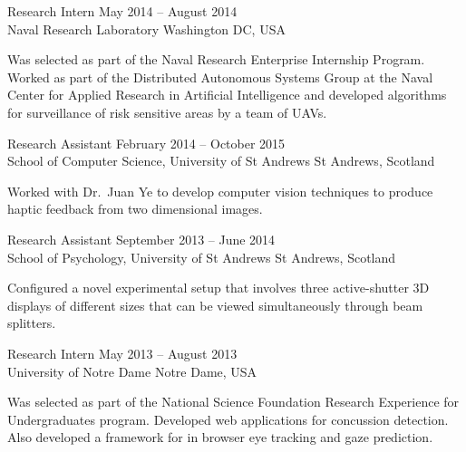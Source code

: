 \documentclass[line,margin]{cv}
\begin{document}
\begin{resume}
\begin{adjustwidth}{2.5em}{2.5em}
\end{adjustwidth}

\newpage

Research Intern
\hfill May 2014 -- August 2014 \\
Naval Research Laboratory \hfill Washington DC, USA

\begin{adjustwidth}{2.5em}{2.5em}

    Was selected as part of the Naval Research Enterprise Internship Program.
    Worked as part of the Distributed Autonomous Systems Group at the Naval
    Center for Applied Research in Artificial Intelligence and developed
    algorithms for surveillance of risk sensitive areas by a team of UAVs.

\end{adjustwidth}

Research Assistant
\hfill February 2014 -- October 2015 \\
School of Computer Science, University of St Andrews \hfill St Andrews,
Scotland

\begin{adjustwidth}{2.5em}{2.5em}

    Worked with Dr.\ Juan Ye to develop computer vision techniques to produce
    haptic feedback from two dimensional images.

\end{adjustwidth}

Research Assistant
\hfill September 2013 -- June 2014 \\
School of Psychology, University of St Andrews \hfill St Andrews, Scotland

\begin{adjustwidth}{2.5em}{2.5em}

    Configured a novel experimental setup that involves three active-shutter 3D
    displays of different sizes that can be viewed simultaneously through beam
    splitters.

\end{adjustwidth}

Research Intern
\hfill May 2013 -- August 2013 \\
University of Notre Dame \hfill Notre Dame, USA

\begin{adjustwidth}{2.5em}{2.5em}

    Was selected as part of the National Science Foundation Research Experience
    for Undergraduates program. Developed web applications for concussion
    detection. Also developed a framework for in browser eye tracking and gaze
    prediction.


\end{adjustwidth}
\end{resume}
\end{document}
